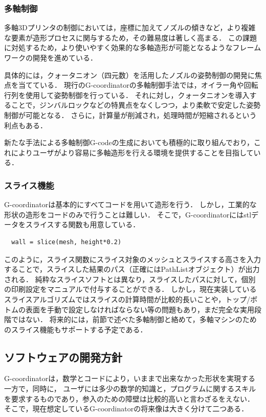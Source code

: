 \documentclass{article}
\begin{document}
\begin{twocolumn}
\begin{itemize}
\subsubsection{多軸制御}
多軸3Dプリンタの制御においては，座標に加えてノズルの傾きなど，より複雑な要素が造形プロセスに関与するため，その難易度は著しく高まる．
この課題に対処するため，より使いやすく効果的な多軸造形が可能となるようなフレームワークの開発を進めている．

具体的には，クォータニオン（四元数）を活用したノズルの姿勢制御の開発に焦点を当てている．
現行のG-coordinatorの多軸制御手法では，オイラー角や回転行列を使用して姿勢制御を行っている．
それに対し，クォータニオンを導入することで，ジンバルロックなどの特異点をなくしつつ，より柔軟で安定した姿勢制御が可能となる．\cite{yamaguchi1991}
さらに，計算量が削減され，処理時間が短縮されるという利点もある．

新たな手法による多軸制御G-codeの生成においても積極的に取り組んでおり，これによりユーザがより容易に多軸造形を行える環境を提供することを目指している．

\subsubsection{スライス機能}
G-coordinatorは基本的にすべてコードを用いて造形を行う．
しかし，工業的な形状の造形をコードのみで行うことは難しい．
そこで，G-coordinatorにはstlデータをスライスする関数も用意している．

\begin{lstlisting}
  wall = slice(mesh, height*0.2)
\end{lstlisting}
このように，スライス関数にスライス対象のメッシュとスライスする高さを入力することで，スライスした結果のパス（正確にはPathListオブジェクト）が出力される．
純粋なスライスソフトとは異なり，スライスしたパスに対して，個別の印刷設定をマニュアルで付与することができる．
しかし，現在実装しているスライスアルゴリズムではスライスの計算時間が比較的長いことや，トップ/ボトムの表面を手動で設定しなければならない等の問題もあり，まだ完全な実用段階ではない．
将来的には，前節で述べた多軸制御と絡めて，多軸マシンのためのスライス機能もサポートする予定である．

\subsection{ソフトウェアの開発方針}

G-coordinatorは，数学とコードにより，いままで出来なかった形状を実現する一方で，同時に，
ユーザには多少の数学的知識と，プログラムに関するスキルを要求するものであり，参入のための障壁は比較的高いと言わざるをえない．
そこで，現在想定しているG-coordinatorの将来像は大きく分けて二つある．


\end{itemize}
\end{twocolumn}
\end{document}
